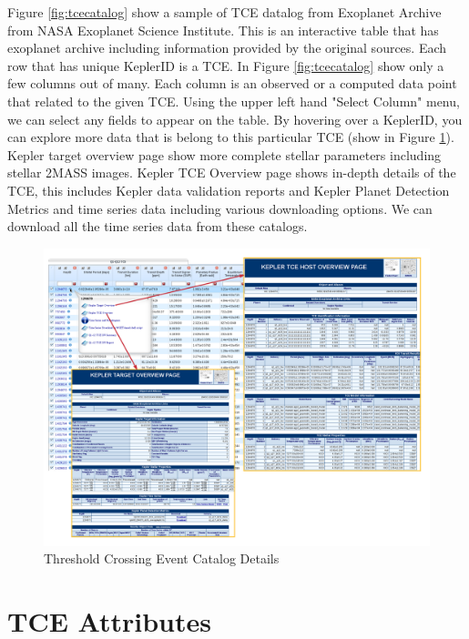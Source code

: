 Figure \ref{fig:tcecatalog} show a sample of TCE datalog from Exoplanet Archive from  NASA Exoplanet Science Institute. This is an interactive table that has exoplanet archive including information provided by the original sources. Each row that has unique KeplerID is a TCE. In Figure \ref{fig:tcecatalog} show only a few columns out of many. Each column is an observed or a computed data point that related to the given TCE. Using the upper left hand "Select Column" menu, we can select any fields to appear on the table. By hovering over a KeplerID, you can explore more data that is belong to this particular TCE (show in Figure \ref{fig:tcecatalogdetail}). Kepler target overview page show more complete stellar parameters including stellar 2MASS images. Kepler TCE Overview page shows in-depth details of the TCE, this includes Kepler data validation reports and Kepler Planet Detection Metrics and time series data including various downloading options. We can download all the time series data from these catalogs. 

\begin{figure}[!h]
\begin{center}
        \includegraphics[width=0.8\textheight]{img/tceoptions.png}
        \caption{Threshold Crossing Event Catalog Details}  \label{fig:tcecatalogdetail}
\end{center}
\end{figure}

\section{TCE Attributes}
\label{label:tce_attributes}

